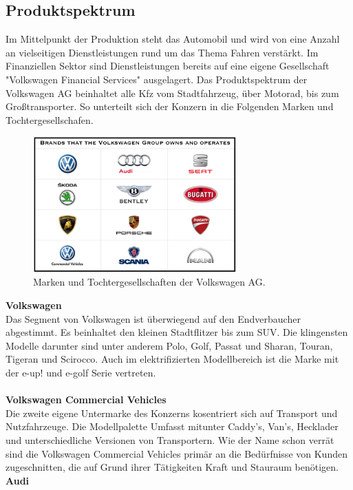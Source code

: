 \documentclass[12pt]{article}
\begin{document}
\subsection{Produktspektrum}
Im Mittelpunkt der Produktion steht das Automobil und wird von eine Anzahl an vielseitigen Dienstleistungen rund um das Thema Fahren verstärkt. Im Finanziellen Sektor sind Dienstleistungen bereits auf eine eigene Gesellschaft "Volkswagen Financial Services" ausgelagert.
Das Produktspektrum der Volkswagen AG beinhaltet alle Kfz vom Stadtfahrzeug, über Motorad, bis zum Großtransporter.
So unterteilt sich der Konzern in die Folgenden Marken und Tochtergesellschafen.\\
\begin{figure}[here!]
\centering
\includegraphics[width=0.7\textwidth]{images/Volkswagen-Group-Brands}
\caption{Marken und Tochtergesellschaften der Volkswagen AG. \cite{marken}}
\end{figure}\FloatBarrier
\noindent
\textbf{Volkswagen}\\
Das Segment von Volkswagen ist überwiegend auf den Endverbaucher abgestimmt. Es beinhaltet den kleinen Stadtflitzer bis zum SUV. Die klingensten Modelle darunter sind unter anderem Polo, Golf, Passat und Sharan, Touran, Tigeran und Scirocco.
Auch im elektrifizierten Modellbereich ist die Marke mit der e-up! und e-golf Serie vertreten.\\
\\
\textbf{Volkswagen Commercial Vehicles}\\
Die zweite eigene Untermarke des Konzerns kosentriert sich auf Transport und Nutzfahrzeuge. Die Modellpalette Umfasst mitunter Caddy's, Van's, Hecklader und unterschiedliche Versionen von Transportern. Wie der Name schon verrät sind die Volkswagen Commercial Vehicles primär an die Bedürfnisse von Kunden zugeschnitten, die auf Grund ihrer Tätigkeiten Kraft und Stauraum benötigen.
\newpage
\textbf{Audi}\\
\end{document}
